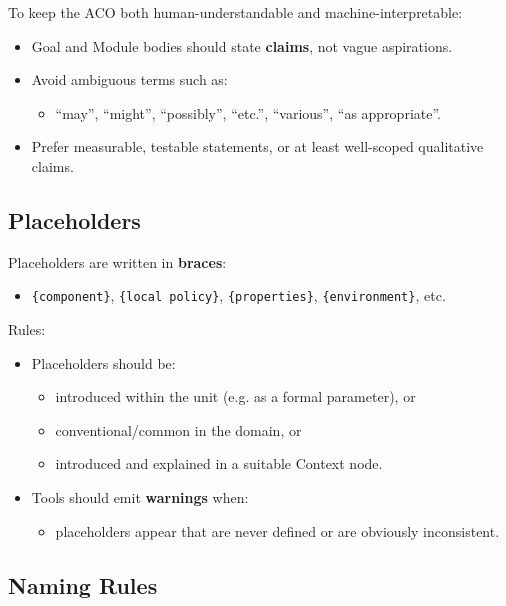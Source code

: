 \documentclass[11pt]{article}
\begin{document}
To keep the ACO both human-understandable and machine-interpretable:
\begin{itemize}[leftmargin=2em]
  \item Goal and Module bodies should state \textbf{claims}, not vague aspirations.
  \item Avoid ambiguous terms such as:
  \begin{itemize}[leftmargin=1.5em]
    \item ``may'', ``might'', ``possibly'', ``etc.'', ``various'', ``as appropriate''.
  \end{itemize}
  \item Prefer measurable, testable statements, or at least well-scoped qualitative claims.
\end{itemize}

\subsection{Placeholders}

Placeholders are written in \textbf{braces}:
\begin{itemize}[leftmargin=2em]
  \item \texttt{\{component\}}, \texttt{\{local policy\}}, \texttt{\{properties\}}, \texttt{\{environment\}}, etc.
\end{itemize}

Rules:
\begin{itemize}[leftmargin=2em]
  \item Placeholders should be:
  \begin{itemize}[leftmargin=1.5em]
    \item introduced within the unit (e.g. as a formal parameter), or
    \item conventional/common in the domain, or
    \item introduced and explained in a suitable Context node.
  \end{itemize}
  \item Tools should emit \textbf{warnings} when:
  \begin{itemize}[leftmargin=1.5em]
    \item placeholders appear that are never defined or are obviously inconsistent.
  \end{itemize}
\end{itemize}

\subsection{Naming Rules}
\end{document}
